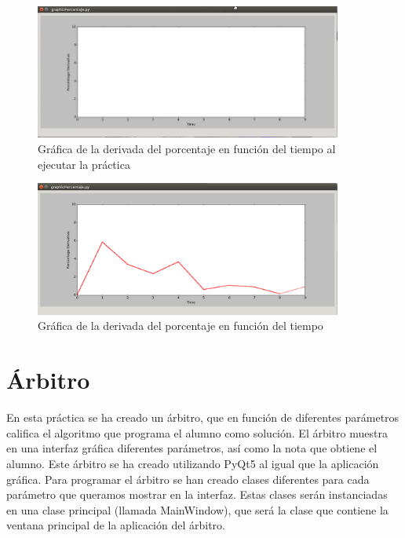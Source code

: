 \begin{figure}[H]
  \begin{center}
    \includegraphics[width=0.9\textwidth]{figures/Vacuum/Grafica_percentaje1.png}
		\caption{Gráfica de la derivada del porcentaje en función del tiempo al ejecutar la práctica}
		\label{fig.grafica_percentaje1}
		\end{center}
\end{figure}

\begin{figure}[H]
  \begin{center}
    \includegraphics[width=0.9\textwidth]{figures/Vacuum/Grafica_percentaje2.png}
		\caption{Gráfica de la derivada del porcentaje en función del tiempo}
		\label{fig.grafica_percentaje2}
		\end{center}
\end{figure}

\section{Árbitro}
En esta práctica se ha creado un árbitro, que en función de diferentes parámetros califica el algoritmo que programa el alumno como solución. El árbitro muestra en una interfaz gráfica diferentes parámetros, así como la nota que obtiene el alumno. Este árbitro se ha creado utilizando PyQt5 al igual que la aplicación gráfica. Para programar el árbitro se han creado clases diferentes para cada parámetro que queramos mostrar en la interfaz. Estas clases serán instanciadas en una clase principal (llamada MainWindow), que será la clase que contiene la ventana principal de la aplicación del árbitro.\\

